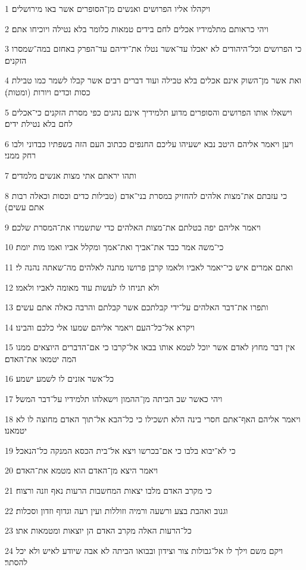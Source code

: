 \par 1 ויקהלו אליו הפרושים ואנשים מן־הסופרים אשר באו מירושלים׃
\par 2 ויהי כראותם מתלמידיו אכלים לחם בידים טמאות כלומר בלא נטילה ויוכיחו אתם׃
\par 3 כי הפרושים וכל־היהודים לא יאכלו עד־אשר נטלו את־ידיהם עד־הפרק באחזם במה־שמסרו הזקנים׃
\par 4 ואת אשר מן־השוק אינם אכלים בלא טבילה ועוד דברים רבים אשר קבלו לשמר כמו טבילת כסות וכדים ויורות (ומטות)׃
\par 5 וישאלו אותו הפרושים והסופרים מדוע תלמידיך אינם נהגים כפי מסרת הזקנים כי־אכלים לחם בלא נטילת ידים׃
\par 6 ויען ויאמר אליהם היטב נבא ישעיהו עליכם החנפים ככתוב העם הזה בשפתיו כבדוני ולבו רחק ממני׃
\par 7 ותהו יראתם אתי מצות אנשים מלמדים׃
\par 8 כי עזבתם את־מצות אלהים להחזיק במסרת בני־אדם (טבילות כדים וכסות וכאלה רבות אתם עשים)׃
\par 9 ויאמר אליהם יפה בטלתם את־מצות האלהים כדי שתשמרו את־המסרת שלכם׃
\par 10 כי־משה אמר כבד את־אביך ואת־אמך ומקלל אביו ואמו מות יומת׃
\par 11 ואתם אמרים איש כי־יאמר לאביו ולאמו קרבן פרושו מתנה לאלהים מה־שאתה נהנה לי׃
\par 12 ולא תניחו לו לעשות עוד מאומה לאביו ולאמו׃
\par 13 ותפרו את־דבר האלהים על־ידי קבלתכם אשר קבלתם והרבה כאלה אתם עשים׃
\par 14 ויקרא אל־כל־העם ויאמר אליהם שמעו אלי כלכם והבינו׃
\par 15 אין דבר מחוץ לאדם אשר יוכל לטמא אותו בבאו אל־קרבו כי אם־הדברים היוצאים ממנו המה יטמאו את־האדם׃
\par 16 כל־אשר אזנים לו לשמע ישמע׃
\par 17 ויהי כאשר שב הביתה מן־ההמון וישאלהו תלמידיו על־דבר המשל׃
\par 18 ויאמר אליהם האף־אתם חסרי בינה הלא תשכילו כי כל־הבא אל־תוך האדם מחוצה לו לא יטמאנו׃
\par 19 כי לא־יבוא בלבו כי אם־בכרשו ויצא אל־בית הכסא המנקה כל־הנאכל׃
\par 20 ויאמר היצא מן־האדם הוא מטמא את־האדם׃
\par 21 כי מקרב האדם מלבו יצאות המחשבות הרעות נאף וזנה ורצוח׃
\par 22 וגנוב ואהבת בצע ורשעה ורמיה וזוללות ועין רעה וגדוף וזדון וסכלות׃
\par 23 כל־הרעות האלה מקרב האדם הן יוצאות ומטמאות אתו׃
\par 24 ויקם משם וילך לו אל־גבולות צור וצידון ובבואו הביתה לא אבה שיודע לאיש ולא יכל להסתר׃
